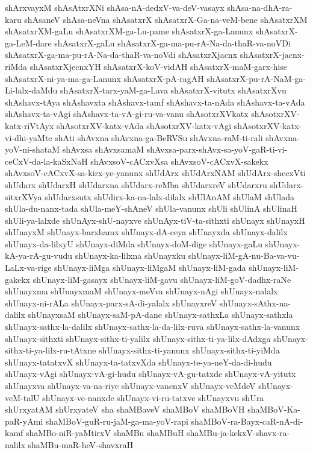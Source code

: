 {shArxvayxM
shAsAtxrXNi
shAsa-nA-dedxV-va-deV-vasayx
shAsa-na-dhA-ra-karu
shAsaneV
shAsa-neVna
shAsatxrX
shAsatxrX-Ga-na-veM-bene
shAsatxrXM
shAsatxrXM-gaLu
shAsatxrXM-ga-Lu-pame
shAsatxrX-ga-Lanunx
shAsatxrX-ga-LeM-dare
shAsatxrX-gaLu
shAsatxrX-ga-ma-pu-rA-Na-da-thaR-va-noVDi
shAsatxrX-ga-ma-pu-rA-Na-da-thaR-va-noVdi
shAsatxrXjacnx
shAsatxrX-jacnx-riMda
shAsatxrXjecnxYH
shAsatxrX-koV-vidAH
shAsatxrX-maM-garx-hise
shAsatxrX-ni-ya-ma-ga-Lanunx
shAsatxrX-pA-ragAH
shAsatxrX-pu-rA-NaM-ga-Li-lalx-daMdu
shAsatxrX-tarx-yaM-ga-Lava
shAsatxrX-vitutx
shAsatxrXvu
shAshavx-tAya
shAshavxta
shAshavx-tamf
shAshavx-ta-nAda
shAshavx-ta-vAda
shAshavx-ta-vAgi
shAshavx-ta-vA-gi-ru-va-vanu
shAsotxrXVkatx
shAsotxrXV-katx-riVtAyx
shAsotxrXV-katx-vAda
shAsotxrXV-katx-vAgi
shAsotxrXV-katx-vi-dhi-yaMte
shAti
shAvxna
shAvxna-ga-BeRVSu
shAvxna-raM-ti-rali
shAvxna-yoV-ni-shataM
shAvxsa
shAvxsamaM
shAvxsa-parx-shAvx-sa-yoV-gaR-ti-vi-ceCxV-da-la-kaSxNaH
shAvxsoV-cACxvXsa
shAvxsoV-cACxvX-sakekx
shAvxsoV-cACxvX-sa-kirx-ye-yanunx
shUdArx
shUdArxNAM
shUdArx-shecxVti
shUdarx
shUdarxH
shUdarxna
shUdarx-reMba
shUdarxreV
shUdarxru
shUdarx-sitxrXVya
shUdarxsutx
shUdirx-ka-na-lalx-dilalx
shUlAnAM
shUlaM
shUlada
shUla-du-nanx-tada
shUla-meY-shAneV
shUla-vanunx
shUli
shUlinA
shUlinaH
shUli-ya-lalxde
shUnAyx-shU-nayxve
shUnAyx-tiV-ta-sithxti
shUnayx
shUnayxH
shUnayxM
shUnayx-barxhamx
shUnayx-dA-ceya
shUnayxda
shUnayx-dalilx
shUnayx-da-lilxyU
shUnayx-diMda
shUnayx-doM-dige
shUnayx-gaLu
shUnayx-kA-ya-rA-gu-vudu
shUnayx-ka-lilxna
shUnayxku
shUnayx-liM-gA-nu-Ba-va-vu-LaLx-va-rige
shUnayx-liMga
shUnayx-liMgaM
shUnayx-liM-gada
shUnayx-liM-gakekx
shUnayx-liM-gasayx
shUnayx-liM-gavu
shUnayx-liM-goV-dadhx-raNe
shUnayxma
shUnayxmaM
shUnayx-meVva
shUnayx-nAgi
shUnayx-nalalx
shUnayx-ni-rALa
shUnayx-parx-sA-di-yalalx
shUnayxreV
shUnayx-sAthx-na-dalilx
shUnayxsaM
shUnayx-saM-pA-dane
shUnayx-sathxLa
shUnayx-sathxla
shUnayx-sathx-la-dalilx
shUnayx-sathx-la-da-lilx-ruva
shUnayx-sathx-la-vanunx
shUnayx-sithxti
shUnayx-sithx-ti-yalilx
shUnayx-sithx-ti-ya-lilx-dAdxga
shUnayx-sithx-ti-ya-lilx-ru-tAtxne
shUnayx-sithx-ti-yanunx
shUnayx-sithx-ti-yiMda
shUnayx-tatatxvX
shUnayx-ta-tatxvXda
shUnayx-te-ya-neY-da-di-hudu
shUnayx-vAgi
shUnayx-vA-gi-hudu
shUnayx-vA-gu-tatxde
shUnayx-vA-yitutx
shUnayxva
shUnayx-va-na-riye
shUnayx-vanenxV
shUnayx-veMdeV
shUnayx-veM-talU
shUnayx-ve-nanxde
shUnayx-vi-ru-tatxve
shUnayxvu
shUra
shUrxyatAM
shUrxyateV
sha
shaMBaveV
shaMBoV
shaMBoVH
shaMBoV-Ka-paR-yAmi
shaMBoV-guR-ru-jaM-ga-ma-yoV-rapi
shaMBoV-ra-Bayx-caR-nA-di-kamf
shaMBo-niR-yaMtirxV
shaMBu
shaMBuH
shaMBu-ja-kekxV-shavx-ra-nalilx
shaMBu-maR-heV-shavxraH
}
